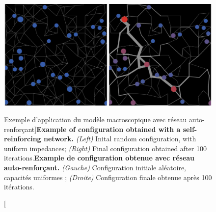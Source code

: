 \begin{figure}
	\includegraphics[width=\linewidth]{Figures/Final/6-2-3-fig-macrocoevol-slimemould}
	\caption[Example of application of the macroscopic model with a self-reinforcing network][Exemple d'application du modèle macroscopique avec réseau auto-renforçant]{\textbf{Example of configuration obtained with a self-reinforcing network.} \textit{(Left)} Inital random configuration, with uniform impedances; \textit{(Right)} Final configuration obtained after 100 iterations.\label{fig:macrocoevolution:slimemould}}{\textbf{Example de configuration obtenue avec réseau auto-renforçant.} \textit{(Gauche)} Configuration initiale aléatoire, capacités uniformes ; \textit{(Droite)} Configuration finale obtenue après 100 itérations.\label{fig:macrocoevolution:slimemould}}
\end{figure}










